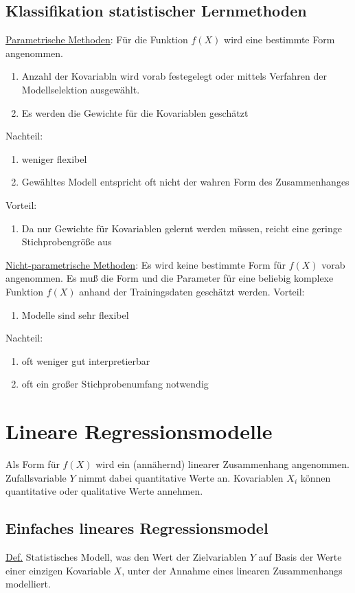 \documentclass[10pt]{report}
\theoremstyle{definition}
\begin{document}
\subsection{Klassifikation statistischer Lernmethoden}
\underline{Parametrische Methoden}: Für die Funktion $f(X)$ wird eine bestimmte Form angenommen.
\begin{enumerate}
	\item Anzahl der Kovariabln wird vorab festegelegt oder mittels Verfahren der Modellselektion ausgewählt.
	\item Es werden die Gewichte für die Kovariablen geschätzt
\end{enumerate}
Nachteil: 
\begin{enumerate}
	\item weniger flexibel
	\item Gewähltes Modell entspricht oft nicht der wahren Form des Zusammenhanges
\end{enumerate}
Vorteil:
\begin{enumerate}
	\item Da nur Gewichte für Kovariablen gelernt werden müssen, reicht eine geringe Stichprobengröße aus
\end{enumerate}

\underline{Nicht-parametrische Methoden}: Es wird keine bestimmte Form für $f(X)$ vorab angenommen.
Es muß die Form und die Parameter für eine beliebig komplexe Funktion $f(X)$ anhand der Trainingsdaten geschätzt werden.
Vorteil:
\begin{enumerate}
	\item Modelle sind sehr flexibel
\end{enumerate}

Nachteil:
\begin{enumerate}
	\item oft weniger gut interpretierbar
	\item oft ein großer Stichprobenumfang notwendig
\end{enumerate}

\section{Lineare Regressionsmodelle}
Als Form für $f(X)$ wird ein (annähernd) linearer Zusammenhang angenommen. Zufallsvariable $Y$ nimmt dabei quantitative Werte an. 
Kovariablen $X_i$ können quantitative oder qualitative Werte annehmen.

\subsection{Einfaches lineares Regressionsmodel}
\underline{Def.} Statistisches Modell, was den Wert der Zielvariablen $Y$ auf Basis der Werte einer einzigen Kovariable $X$, unter der Annahme eines linearen Zusammenhangs modelliert.
\end{document}
